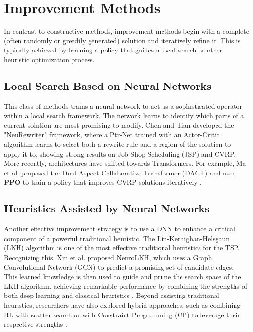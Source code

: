\section{Improvement Methods}
In contrast to constructive methods, improvement methods begin with a complete (often randomly or greedily generated) solution and iteratively refine it.
This is typically achieved by learning a policy that guides a local search or other heuristic optimization process.

\subsection{Local Search Based on Neural Networks}
This class of methods trains a neural network to act as a sophisticated operator within a local search framework.
The network learns to identify which parts of a current solution are most promising to modify.
Chen and Tian developed the "NeuRewriter" framework, where a Ptr-Net trained with an Actor-Critic algorithm learns to select both a rewrite rule and a region of the solution to apply it to, showing strong results on Job Shop Scheduling (JSP) and CVRP.
More recently, architectures have shifted towards Transformers. For example, Ma et al. proposed the Dual-Aspect Collaborative Transformer (DACT) and used \textbf{PPO} to train a policy that improves CVRP solutions iteratively \cite{wangSolvingCombinatorialOptimization2024}.

\subsection{Heuristics Assisted by Neural Networks}
Another effective improvement strategy is to use a DNN to enhance a critical component of a powerful traditional heuristic.
The Lin-Kernighan-Helsgaun (LKH) algorithm is one of the most effective traditional heuristics for the TSP. Recognizing this, Xin et al. proposed NeuroLKH, which uses a Graph Convolutional Network (GCN) to predict a promising set of candidate edges.
This learned knowledge is then used to guide and prune the search space of the LKH algorithm, achieving remarkable performance by combining the strengths of both deep learning and classical heuristics \cite{wangSolvingCombinatorialOptimization2024}. Beyond assisting traditional heuristics, researchers have also explored hybrid approaches, such as combining RL with scatter search \cite{zhaoReinforcementLearningdrivenCooperative2024} or with Constraint Programming (CP) to leverage their respective strengths \cite{cappartCombiningReinforcementLearning2021}.


